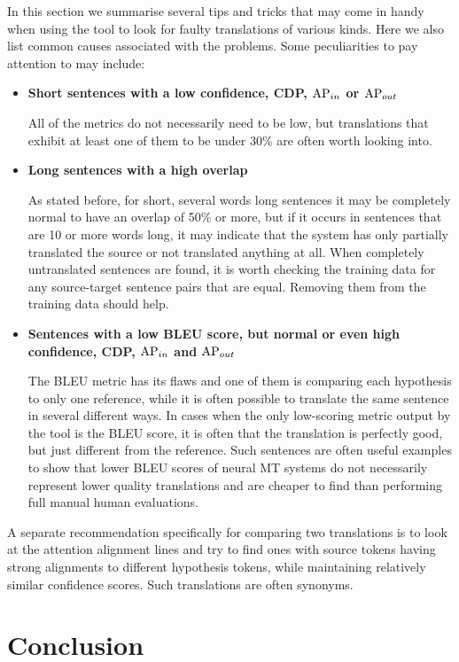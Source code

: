 \documentclass[runningheads,a4paper]{lncs/llncs}
\begin{document}
In this section we summarise several tips and tricks that may come in handy when using the tool to look for faulty translations of various kinds. Here we also list common causes associated with the problems. Some peculiarities to pay attention to may include:
  \begin{itemize}
    \item \textbf{Short sentences with a low confidence, CDP, \({\rm AP}_{in}\) or \({\rm AP}_{out}\)} 
    
    All of the metrics do not necessarily need to be low, but translations that exhibit at least one of them to be under 30\% are often worth looking into.
    \item \textbf{Long sentences with a high overlap}
    
    As stated before, for short, several words long sentences it may be completely normal to have an overlap of 50\% or more, but if it occurs in sentences that are 10 or more words long, it may indicate that the system has only partially translated the source or not translated anything at all. When completely untranslated sentences are found, it is worth checking the training data for any source-target sentence pairs that are equal. Removing them from the training data should help.
    \item \textbf{Sentences with a low BLEU score, but normal or even high confidence, CDP, \({\rm AP}_{in}\) and \({\rm AP}_{out}\)}
    
    The BLEU metric has its flaws and one of them is comparing each hypothesis to only one reference, while it is often possible to translate the same sentence in several different ways. In cases when the only low-scoring metric output by the tool is the BLEU score, it is often that the translation is perfectly good, but just different from the reference. Such sentences are often useful examples to show that lower BLEU scores of neural MT systems do not necessarily represent lower quality translations and are cheaper to find than performing full manual human evaluations.
  \end{itemize}

A separate recommendation specifically for comparing two translations is to look at the attention alignment lines and try to find ones with source tokens having strong alignments to different hypothesis tokens, while maintaining relatively similar confidence scores. Such translations are often synonyms.

\section{Conclusion}
\label{sec:conclusion}
\end{document}
